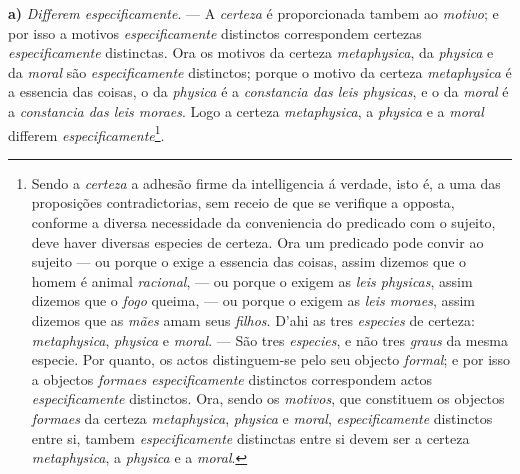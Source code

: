 \textbf{a)} \emph{Differem especificamente}. --- A \emph{certeza} é proporcionada tambem ao \emph{motivo}; e por isso a motivos \emph{especificamente} distinctos correspondem certezas \emph{especificamente} distinctas. Ora os motivos da certeza \emph{metaphysica}, da \emph{physica} e da \emph{moral} são \emph{especificamente} distinctos; porque o motivo da certeza \emph{metaphysica} é a essencia das coisas, o da \emph{physica} é a \emph{constancia das leis physicas}, e o da \emph{moral} é a \emph{constancia das leis moraes}. Logo a certeza \emph{metaphysica}, a \emph{physica} e a \emph{moral} differem \emph{especificamente}\footnote{Sendo a \emph{certeza} a adhesão firme da intelligencia á verdade, isto é, a uma das proposições contradictorias, sem receio de que se verifique a opposta, conforme a diversa necessidade da conveniencia do predicado com o sujeito, deve haver diversas especies de certeza. Ora um predicado pode convir ao sujeito --- ou porque o exige a essencia das coisas, assim dizemos que o homem é animal \emph{racional}, --- ou porque o exigem as \emph{leis physicas}, assim dizemos que o \emph{fogo} queima, --- ou porque o exigem as \emph{leis moraes}, assim dizemos que as \emph{mães} amam seus \emph{filhos}. D'ahi as tres \emph{especies} de certeza: \emph{metaphysica}, \emph{physica} e \emph{moral}. --- São tres \emph{especies}, e não tres \emph{graus} da mesma especie. Por quanto, os actos distinguem-se pelo seu objecto \emph{formal}; e por isso a objectos \emph{formaes especificamente} distinctos correspondem actos \emph{especificamente} distinctos. Ora, sendo os \emph{motivos}, que constituem os objectos \emph{formaes} da certeza \emph{metaphysica}, \emph{physica} e \emph{moral}, \emph{especificamente} distinctos entre si, tambem \emph{especificamente} distinctas entre si devem ser a certeza \emph{metaphysica}, a \emph{physica} e a \emph{moral}.}.

